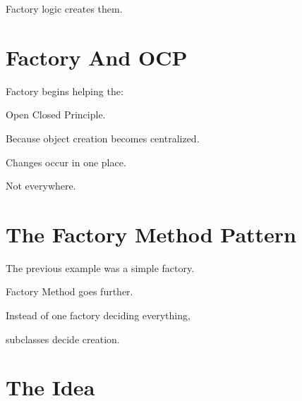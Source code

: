 \documentclass[11pt,a4paper]{book}
\begin{document}

Factory logic creates them.


\section{Factory And OCP}

Factory begins helping the:


Open Closed Principle.


Because object creation becomes
centralized.


Changes occur in one place.


Not everywhere.


\section{The Factory Method Pattern}

The previous example was a
simple factory.


Factory Method goes further.


Instead of one factory deciding
everything,

subclasses decide creation.


\section{The Idea}
\end{document}
